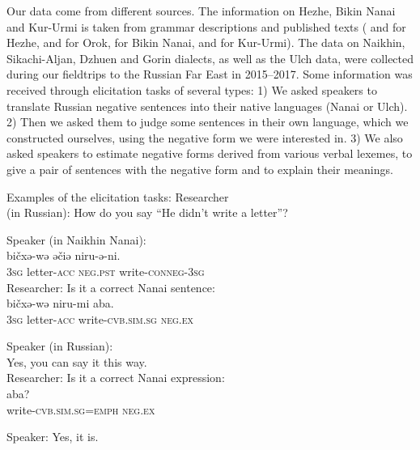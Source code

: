 \documentclass[output=paper]{langscibook}
\begin{document}
Our data come from different sources. The information on Hezhe, Bikin Nanai and Kur-Urmi is taken from grammar descriptions and published texts (\citealt{zhang1989a} and \citealt{zhang2013a} for Hezhe,
\citealt{petrova1967a} and \citealt{tsumagari2009a} for Orok,
\citealt{sem1976a} for Bikin Nanai, and
\citealt{sunik1958a} for Kur-Urmi). The data on Naikhin, Sikachi-Aljan, Dzhuen and Gorin dialects, as well as the Ulch data, were collected during our fieldtrips to the Russian Far East in 2015–2017. Some information was received through elicitation tasks of several types: 1) We asked speakers to translate Russian negative sentences into their native languages (Nanai or Ulch). 2) Then we asked them to judge some sentences in their own language, which we constructed ourselves, using the negative form we were interested in. 3) We also asked speakers to estimate negative forms derived from various verbal lexemes, to give a pair of sentences with the negative form and to explain their meanings.

\ea
Examples of the elicitation tasks:
\ea  Researcher   \\
    (in Russian):  {How do you say “He didn’t write a letter”?} \\
    \medskip

    Speaker (in  Naikhin Nanai):\\
      {bičxə-wə}  {əčiə}  {{niru-ə-ni.}} \\
        \textsc{3sg}  letter-\textsc{acc}  \textsc{neg.pst}  {write-\textsc{conneg-3sg}} \\

\ex  Researcher:  {Is it a correct Nanai sentence:} \\
      {bičxə-wə}  {niru-mi}  {{aba.}} \\
        \textsc{3sg}  letter-\textsc{acc}  write-\textsc{cvb.sim.sg}  {\textsc{neg.ex}} \\
\medskip

    Speaker (in  {}     Russian):\\
    {Yes, you can say it this way.} \\

\ex  Researcher:  {Is it a correct Nanai expression:} \\
      {{aba?}} \\
    {write-\textsc{cvb.sim.sg=emph}}   {\textsc{neg.ex}} \\
\medskip

    Speaker:  {Yes, it is.} \\
\medskip
\end{document}
